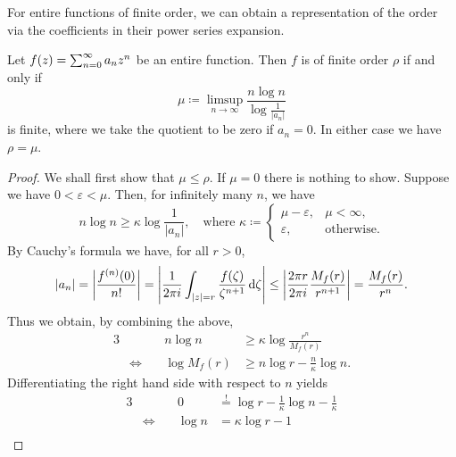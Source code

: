 For entire functions of finite order, we can obtain a representation of the order via the coefficients in their power series expansion.

\begin{theorem} \label{thm:order-power-series}
    Let $f(z) = \sum_{n=0}^\infty {a_n}z^{n}$ be an entire function. Then $f$ is of finite order $\rho$ if and only if
    $$ \mu \coloneqq \limsup_{n \to \infty} \frac{n \log n}{\log \frac{1}{\vert a_n \vert}} $$
    is finite, where we take the quotient to be zero if $a_n = 0$. In either case we have $\rho = \mu$.
\end{theorem}

\begin{proof}
    We shall first show that $\mu \leq \rho$. If $\mu = 0$ there is nothing to show. Suppose we have $0 < \varepsilon < \mu$. Then, for infinitely many $n$, we have
    \begin{equation*}
        n \log n \geq \kappa \log \frac{1}{\vert a_n \vert}, \quad \textrm{where } \kappa \coloneqq \left\{ \begin{array}{ll}
            \mu - \varepsilon, & \mu < \infty, \\
            \varepsilon, & \textrm{otherwise}.
        \end{array} \right.
    \end{equation*}
    By Cauchy's formula we have, for all $r > 0$,
    \begin{equation*}
        \vert a_n \vert = \left\vert \frac{f^{(n)}(0)}{n!} \right\vert = \left\vert \frac{1}{2 \pi i} \int_{\vert z \vert = r} \frac{f(\zeta)}{\zeta^{n+1}} \mathop{}\!\mathrm{d} \zeta \right\vert \leq \left\vert \frac{2 \pi r}{2 \pi i} \frac{M_f(r)}{r^{n+1}} \right\vert = \frac{M_f(r)}{r^n}.
    \end{equation*}
    Thus we obtain, by combining the above,
    \begin{alignat*}{3}
        &                \quad & n \log n    &\geq \kappa \log \frac{r^n}{M_f(r)} \\
        &\Leftrightarrow \quad & \log M_f(r) &\geq n \log r - \frac{n}{\kappa} \log n. \tag{\textasteriskcentered} \label{eq:order-power-series-rhs}
    \end{alignat*}
    Differentiating the right hand side with respect to $n$ yields
    \begin{alignat*}{3}
        &                \quad & 0      &\overset{!}{=} \log r - \frac{1}{\kappa} \log n - \frac{1}{\kappa} \\
        &\Leftrightarrow \quad & \log n &= \kappa \log r - 1 \\

\end{alignat*}
\end{proof}
